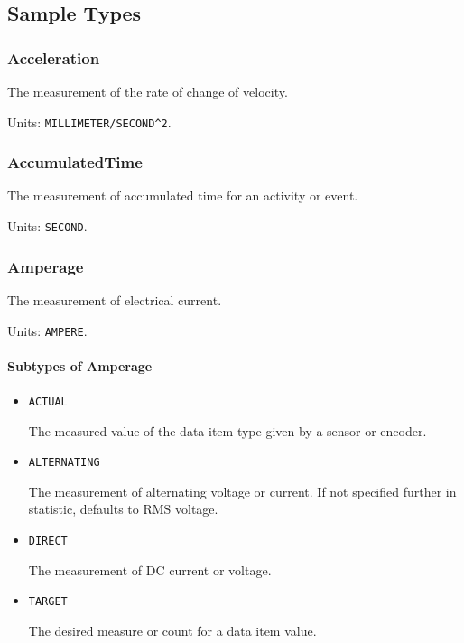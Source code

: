 \subsection{Sample Types} \label{sec:Sample Types}

\subsubsection{Acceleration}
\label{sec:Acceleration}



The measurement of the rate of change of velocity.


Units: \texttt{MILLIMETER/SECOND\^{}2}.

\subsubsection{AccumulatedTime}
\label{sec:AccumulatedTime}



The measurement of accumulated time for an activity or event.


Units: \texttt{SECOND}.

\subsubsection{Amperage}
\label{sec:Amperage}



The measurement of electrical current.


Units: \texttt{AMPERE}.

\paragraph{Subtypes of Amperage}\mbox{}
\label{sec:Subtypes of Amperage}

\begin{itemize}

\item \texttt{ACTUAL}


The measured value of the data item type given by a sensor or encoder.

\item \texttt{ALTERNATING}


The measurement of alternating voltage or current.   If not specified further in statistic, defaults to RMS voltage. 

\item \texttt{DIRECT}


The measurement of DC current or voltage.

\item \texttt{TARGET}


The desired measure or count for a data item value.


\end{itemize}

